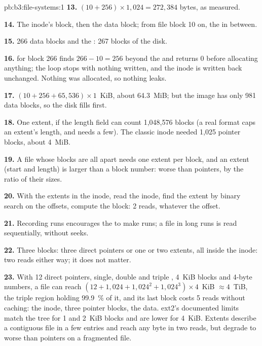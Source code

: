 \begin{solution}{pb:b3:file-systems:1}
\textbf{13.} $(10 + 256) \times 1{,}024 = 272{,}384$ bytes, as measured.

\textbf{14.} The inode's block, then the data block; from file block 10 on, the  in between.

\textbf{15.} 266 data blocks and the : 267 blocks of the disk.

\textbf{16.}  for block 266 finds $266 - 10 = 256$ beyond the  and returns 0 before allocating anything; the loop stops with nothing written, and the inode is written back unchanged. Nothing was allocated, so nothing leaks.

\textbf{17.} $(10 + 256 + 65{,}536) \times 1$~KiB, about 64.3~MiB; but the image has only 981 data blocks, so the disk fills first.

\textbf{18.} One extent, if the length field can count 1,048,576 blocks (a real format caps an extent's length, and needs a few). The classic inode needed 1,025 pointer blocks, about 4~MiB.

\textbf{19.} A file whose blocks are all apart needs one extent per block, and an extent (start and length) is larger than a block number: worse than pointers, by the ratio of their sizes.

\textbf{20.} With the extents in the inode, read the inode, find the extent by binary search on the offsets, compute the block: 2 reads, whatever the offset.

\textbf{21.} Recording runs encourages the  to make runs; a file in long runs is read sequentially, without seeks.

\textbf{22.} Three blocks: three direct pointers or one or two extents, all inside the inode: two reads either way; it does not matter.

\textbf{23.} With 12 direct pointers, single, double and triple , 4~KiB blocks and 4-byte numbers, a file can reach $(12 + 1{,}024 + 1{,}024^2 + 1{,}024^3) \times 4$~KiB $\approx 4$~TiB, the triple region holding 99.9~\% of it, and its last block costs 5 reads without caching: the inode, three pointer blocks, the data. ext2's documented limits match the tree for 1 and 2~KiB blocks and are lower for 4~KiB. Extents describe a contiguous file in a few entries and reach any byte in two reads, but degrade to worse than pointers on a fragmented file.
\end{solution}
